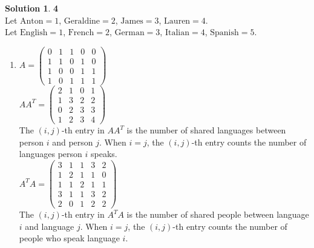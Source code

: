 \documentclass[11pt]{article}
\theoremstyle{definition}
\theoremstyle{nopunct}
\newtheorem*{s}{Solution}
\begin{document}
\begin{s}\textbf{4} \bigskip \\
    Let
    $\text{Anton} = 1$,
    $\text{Geraldine} = 2$,
    $\text{James} = 3$,
    $\text{Lauren} = 4$. \\
    Let
    $\text{English} = 1$,
    $\text{French} = 2$,
    $\text{German} = 3$,
    $\text{Italian} = 4$,
    $\text{Spanish} = 5$.
    \begin{enumerate} 
        \item $A =
            \begin{pmatrix}
                0 & 1 & 1 & 0 & 0 \\
                1 & 1 & 0 & 1 & 0 \\
                1 & 0 & 0 & 1 & 1 \\
                1 & 0 & 1 & 1 & 1
            \end{pmatrix}$
            \bigskip \\
            $AA^T =
            \begin{pmatrix}
                2 & 1 & 0 & 1 \\ 
                1 & 3 & 2 & 2 \\ 
                0 & 2 & 3 & 3 \\ 
                1 & 2 & 3 & 4
            \end{pmatrix}$
            \bigskip \\
            The $(i,j)$-th entry in $AA^T$ is the number of shared
            languages between person $i$ and person $j$. When
            $i = j$, the $(i, j)$-th entry counts the number of
            languages person $i$ speaks.
            \bigskip \\
            $A^TA = 
            \begin{pmatrix}
                3 & 1 & 1 & 3 & 2 \\ 
                1 & 2 & 1 & 1 & 0 \\
                1 & 1 & 2 & 1 & 1 \\
                3 & 1 & 1 & 3 & 2 \\
                2 & 0 & 1 & 2 & 2
            \end{pmatrix}$
            \bigskip \\
            The $(i,j)$-th entry in $A^TA$ is the number of
            shared people between language $i$ and language $j$.
            When $i = j$, the $(i, j)$-th entry counts the
            number of people who speak language $i$.


\end{enumerate}
\end{s}
\end{document}

